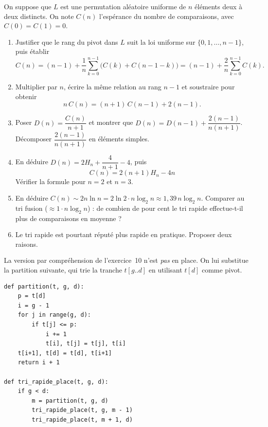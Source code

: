 \documentclass[11pt,a4paper]{article}
\begin{document}
On suppose que $L$ est une permutation aléatoire uniforme de $n$ éléments deux à deux
distincts. On note $C(n)$ l'espérance du nombre de comparaisons, avec $C(0)=C(1)=0$.

\begin{enumerate}[label=\arabic*.,leftmargin=*]
  \item Justifier que le rang du pivot dans $L$ suit la loi uniforme sur
        $\{0,1,\dots,n-1\}$, puis établir
        \[
          C(n) = (n-1) + \frac1n\sum_{k=0}^{n-1}\big(C(k)+C(n-1-k)\big)
               = (n-1) + \frac2n\sum_{k=0}^{n-1}C(k).
        \]
  \item Multiplier par $n$, écrire la même relation au rang $n-1$ et soustraire pour
        obtenir
        \[
          n\,C(n) = (n+1)\,C(n-1) + 2(n-1).
        \]
  \item Poser $D(n)=\dfrac{C(n)}{n+1}$ et montrer que
        $D(n)=D(n-1)+\dfrac{2(n-1)}{n(n+1)}$.
        Décomposer $\dfrac{2(n-1)}{n(n+1)}$ en éléments simples.
  \item En déduire $D(n) = 2H_n + \dfrac{4}{n+1} - 4$, puis
        \[
          \boxed{\;C(n) = 2(n+1)H_n - 4n\;}
        \]
        Vérifier la formule pour $n=2$ et $n=3$.
  \item En déduire $C(n)\sim 2n\ln n = 2\ln 2\cdot n\log_2 n \approx 1{,}39\,n\log_2 n$.
        Comparer au tri fusion ($\approx 1\cdot n\log_2 n$) : de combien de pour cent le
        tri rapide effectue-t-il plus de comparaisons en moyenne ?
  \item Le tri rapide est pourtant réputé plus rapide en pratique. Proposer deux raisons.
\end{enumerate}

La version par compréhension de l'exercice~10 n'est \emph{pas} en place. On lui
substitue la partition suivante, qui trie la tranche $t[g..d]$ en utilisant $t[d]$
comme pivot.

\begin{lstlisting}
def partition(t, g, d):
    p = t[d]
    i = g - 1
    for j in range(g, d):
        if t[j] <= p:
            i += 1
            t[i], t[j] = t[j], t[i]
    t[i+1], t[d] = t[d], t[i+1]
    return i + 1

def tri_rapide_place(t, g, d):
    if g < d:
        m = partition(t, g, d)
        tri_rapide_place(t, g, m - 1)
        tri_rapide_place(t, m + 1, d)
\end{lstlisting}
\end{document}
